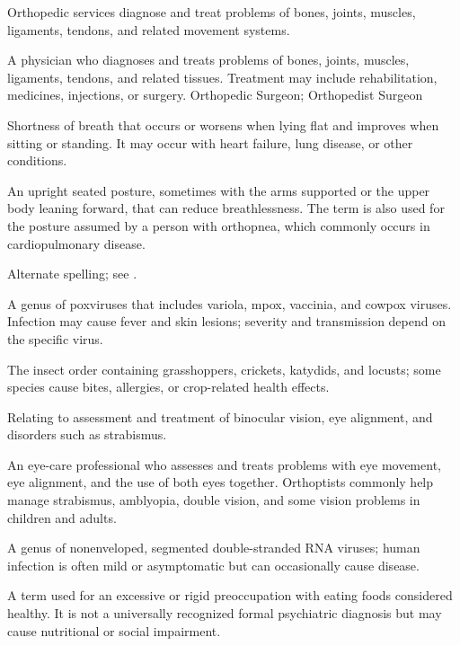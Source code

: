  Orthopedic services diagnose and treat problems of bones, joints, muscles, ligaments, tendons, and related movement systems.

 A physician who diagnoses and treats problems of bones, joints, muscles, ligaments, tendons, and related tissues. Treatment may include rehabilitation, medicines, injections, or surgery.
\synonyms
Orthopedic Surgeon; Orthopedist Surgeon

 Shortness of breath that occurs or worsens when lying flat and improves when sitting or standing. It may occur with heart failure, lung disease, or other conditions.

 An upright seated posture, sometimes with the arms
supported or the upper body leaning forward, that can reduce breathlessness. The
term is also used for the posture assumed by a person with orthopnea, which commonly
occurs in cardiopulmonary disease.

 Alternate spelling; see .

 A genus of poxviruses that includes variola, mpox, vaccinia, and cowpox viruses. Infection may cause fever and skin lesions; severity and transmission depend on the specific virus.

 The insect order containing grasshoppers, crickets, katydids, and locusts; some species cause bites, allergies, or crop-related health effects.

 Relating to assessment and treatment of binocular vision, eye alignment, and disorders such as strabismus.

 An eye-care professional who assesses and treats problems with eye movement, eye alignment, and the use of both eyes together. Orthoptists commonly help manage strabismus, amblyopia, double vision, and some vision problems in children and adults.

 A genus of nonenveloped, segmented double-stranded RNA viruses; human infection is often mild or asymptomatic but can occasionally cause disease.

 A term used for an excessive or rigid preoccupation with eating foods considered healthy. It is not a universally recognized formal psychiatric diagnosis but may cause nutritional or social impairment.

